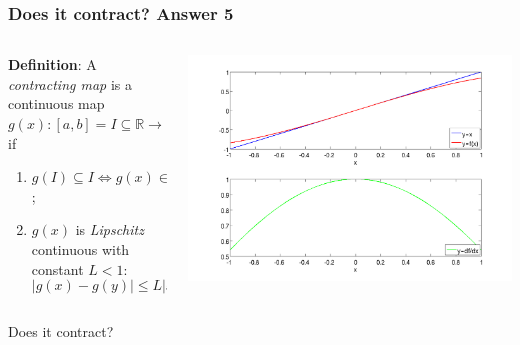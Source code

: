 \documentclass{beamer}
\begin{document}
\begin{frame}
\frametitle{Does it contract? Answer 5}

\begin{columns}
    \begin{column}{0.45\textwidth}
  {\bf Definition}: A \emph{contracting map} is a continuous map
  $g(x) : [a, b] = I \subseteq \mathbb{R} \rightarrow \mathbb{R}$ if
\begin{enumerate}
  \item $g(I) \subseteq I \Leftrightarrow g(x) \in I \, \, \, \forall
    x \in I$;
  \item $g(x)$ is \emph{Lipschitz} continuous with constant $L < 1$:
    \begin{equation*}
      | g(x) - g(y) | \leq L | x - y | \, \, \, \forall x, y \in I.
    \end{equation*}
  \end{enumerate}
\end{column}
\begin{column}{0.55\textwidth}
  \begin{center}
   \includegraphics[width=\textwidth]{figures/cmap2}
  \end{center}
\end{column}
\end{columns}
\begin{overlayarea}{\textwidth}{0.1\textheight}
Does it contract?  
\end{overlayarea}
\end{frame}
\end{document}
